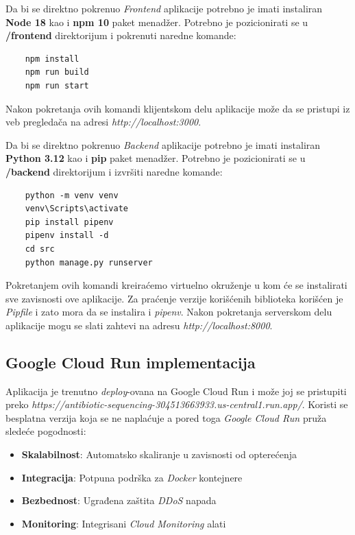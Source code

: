\documentclass[12pt,oneside]{memoir}
\begin{document}
Da bi se direktno pokrenuo \emph{Frontend} aplikacije potrebno je imati instaliran \textbf{Node 18} kao i \textbf{npm 10} paket menadžer. Potrebno je pozicionirati se u \textbf{/frontend} direktorijum i pokrenuti naredne komande:
\begin{verbatim}
    npm install
    npm run build
    npm run start
\end{verbatim}

Nakon pokretanja ovih komandi klijentskom delu aplikacije može da se pristupi iz veb pregledača na adresi \emph{http://localhost:3000}.

Da bi se direktno pokrenuo \emph{Backend} aplikacije potrebno je imati instaliran \textbf{Python 3.12} kao i \textbf{pip} paket menadžer. Potrebno je pozicionirati se u \textbf{/backend} direktorijum i izvršiti naredne komande:  
\begin{verbatim}
    python -m venv venv
    venv\Scripts\activate
    pip install pipenv
    pipenv install -d
    cd src
    python manage.py runserver
\end{verbatim}

Pokretanjem ovih komandi kreiraćemo virtuelno okruženje u kom će se instalirati sve zavisnosti ove aplikacije. Za praćenje verzije korišćenih biblioteka korišćen je \emph{Pipfile} i zato mora da se instalira i \emph{pipenv}.
Nakon pokretanja serverskom delu aplikacije mogu se slati zahtevi na adresu \emph{http://localhost:8000}.

\subsection{Google Cloud Run implementacija}
Aplikacija je trenutno \emph{deploy}-ovana na Google Cloud Run i može joj se pristupiti preko \emph{https://antibiotic-sequencing-304513663933.us-central1.run.app/}.
Koristi se besplatna verzija koja se ne naplaćuje a pored toga \emph{Google Cloud Run} pruža sledeće pogodnosti:

\begin{itemize}
\item \textbf{Skalabilnost}: Automatsko skaliranje u zavisnosti od opterećenja
\item \textbf{Integracija}: Potpuna podrška za \emph{Docker} kontejnere
\item \textbf{Bezbednost}: Ugrađena zaštita \emph{DDoS} napada
\item \textbf{Monitoring}: Integrisani \emph{Cloud Monitoring} alati
\end{itemize}
\end{document}
